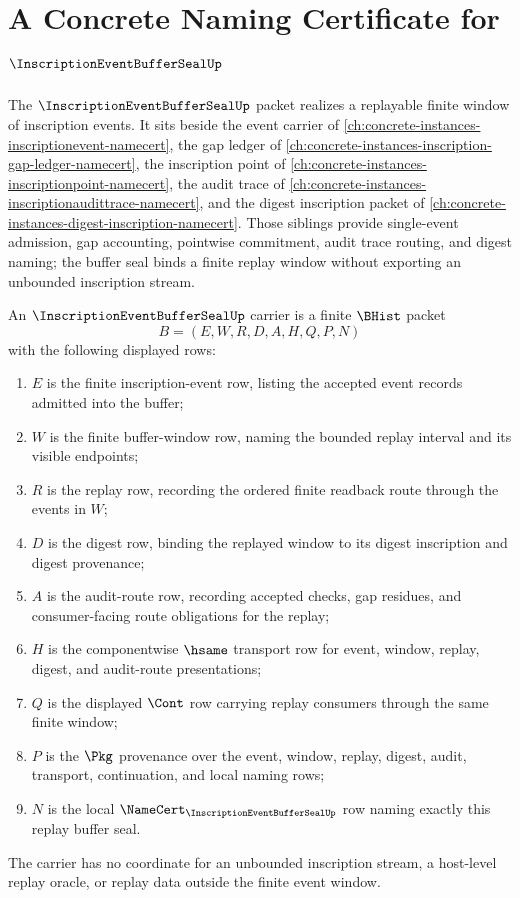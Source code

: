 \chapter{A Concrete Naming Certificate for $\InscriptionEventBufferSealUp$}
\label{ch:concrete-instances-inscriptioneventbufferseal-namecert}

The $\InscriptionEventBufferSealUp$ packet realizes a replayable finite window
of inscription events. It sits beside the event carrier of
\autoref{ch:concrete-instances-inscriptionevent-namecert}, the gap ledger of
\autoref{ch:concrete-instances-inscription-gap-ledger-namecert}, the
inscription point of \autoref{ch:concrete-instances-inscriptionpoint-namecert},
the audit trace of \autoref{ch:concrete-instances-inscriptionaudittrace-namecert},
and the digest inscription packet of
\autoref{ch:concrete-instances-digest-inscription-namecert}. Those siblings
provide single-event admission, gap accounting, pointwise commitment, audit
trace routing, and digest naming; the buffer seal binds a finite replay window
without exporting an unbounded inscription stream.

\begin{definition}
\label{def:inscription-event-buffer-seal-carrier}
An $\InscriptionEventBufferSealUp$ carrier is a finite $\BHist$ packet
$$
B=(E,W,R,D,A,H,Q,P,N)
$$
with the following displayed rows:
\begin{enumerate}
\item $E$ is the finite inscription-event row, listing the accepted event
records admitted into the buffer;
\item $W$ is the finite buffer-window row, naming the bounded replay interval
and its visible endpoints;
\item $R$ is the replay row, recording the ordered finite readback route
through the events in $W$;
\item $D$ is the digest row, binding the replayed window to its digest
inscription and digest provenance;
\item $A$ is the audit-route row, recording accepted checks, gap residues, and
consumer-facing route obligations for the replay;
\item $H$ is the componentwise $\hsame$ transport row for event, window,
replay, digest, and audit-route presentations;
\item $Q$ is the displayed $\Cont$ row carrying replay consumers through the
same finite window;
\item $P$ is the $\Pkg$ provenance over the event, window, replay, digest,
audit, transport, continuation, and local naming rows;
\item $N$ is the local $\NameCert_{\InscriptionEventBufferSealUp}$ row naming
exactly this replay buffer seal.
\end{enumerate}
The carrier has no coordinate for an unbounded inscription stream, a
host-level replay oracle, or replay data outside the finite event window.
\end{definition}

